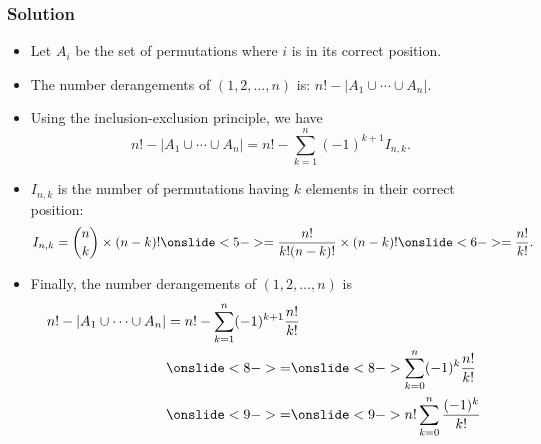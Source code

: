 \documentclass{beamer}
\newcounter{exo}
\newcommand{\exo}{
  \addtocounter{exo}{1}
  Exercice \arabic{exo}
}
\begin{document}
\fi


\ifanswers

\begin{frame}%
\frametitle{Solution}

\scriptsize

\begin{itemize}

\item Let $A_i$ be the set of permutations where $i$ is in its correct position.

\item<2-> The number derangements of $(1, 2, \ldots, n)$ is: $n! - |A_1 \cup \cdots \cup A_n|$.

\item<3-> Using the inclusion-exclusion principle, we have
$$
n! - |A_1 \cup \cdots \cup A_n| = n! - \sum_{k = 1}^n (-1)^{k+1}I_{n,k}.
$$

\item<4-> $I_{n,k}$ is the number of permutations having $k$ elements in their correct position:
$$
I_{n,k} = {n \choose k} \times (n - k)! \onslide<5-> = \frac{n!}{k!(n - k)!} \times (n - k)! \onslide<6-> = \frac{n!}{k!}.
$$

\item<7-> Finally, the number derangements of $(1, 2, \ldots, n)$ is
\begin{align*}
n! - |A_1 \cup \cdots \cup A_n| & = n! - \sum_{k = 1}^n (-1)^{k+1} \frac{n!}{k!} &\\
& \onslide<8->{=}  \onslide<8->{\sum_{k = 0}^n (-1)^{k}\frac{n!}{k!}}&\\
& \onslide<9->{=}  \onslide<9->{n!\sum_{k = 0}^n \frac{(-1)^{k}}{k!}}&\\
\end{align*}

\end{itemize}

\end{frame}
\end{document}
